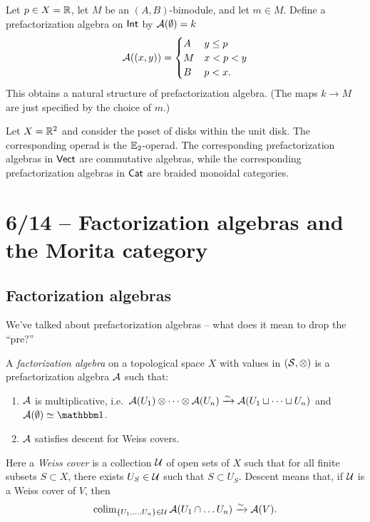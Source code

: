 \begin{ex}
	Let $p \in X = \mathbb{R}$, let $M$ be an $(A, B)$-bimodule, and let $m \in M$.
	Define a prefactorization algebra on $\mathsf{Int}$ by $\mathcal{A}(\emptyset) = k$
	\[
		\mathcal{A}((x, y)) = \begin{cases}
			A & y \leq p \\
			M & x < p < y \\
			B & p < x.
		\end{cases}
	\]
	This obtains a natural structure of prefactorization algebra.
	(The maps $k \to M$ are just specified by the choice of $m$.)
\end{ex}

\begin{ex}
	Let $X = \mathbb{R}^2$ and consider the poset of disks within the unit disk.
	The corresponding operad is the $\mathbb{E}_2$-operad.
	The corresponding prefactorization algebras in $\mathsf{Vect}$ are commutative algebras, while the corresponding prefactorization algebras in $\mathsf{Cat}$ are braided monoidal categories.
\end{ex}

\section{6/14 -- Factorization algebras and the Morita category}

\subsection{Factorization algebras}

We've talked about prefactorization algebras -- what does it mean to drop the ``pre?''

\begin{dfn}
	A \emph{factorization algebra} on a topological space $X$ with values in $(\mathcal{S}, \otimes)$ is a prefactorization algebra $\mathcal{A}$ such that:
	\begin{enumerate}
		\item $\mathcal{A}$ is multiplicative, i.e.\ $\mathcal{A}(U_1) \otimes \dots \otimes \mathcal{A}(U_n) \xrightarrow{\sim} \mathcal{A}(U_1 \sqcup \dots \sqcup U_n)$ and $\Ac(\emptyset) \simeq \onebb$.
		\item $\mathcal{A}$ satisfies descent for Weiss covers.
	\end{enumerate}
	Here a \emph{Weiss cover} is a collection $\mathcal{U}$ of open sets of $X$ such that for all finite subsets $S \subset X$, there exists $U_S \in \mathcal{U}$ such that $S \subset U_S$.
	Descent means that, if $\mathcal{U}$ is a Weiss cover of $V$, then
	\[
		\operatorname{colim}_{\{ U_1, \dots, U_n \} \in \mathcal{U}} \mathcal{A}(U_1 \cap \dots U_n) \xrightarrow{\sim} \mathcal{A}(V).
	\]
\end{dfn}

